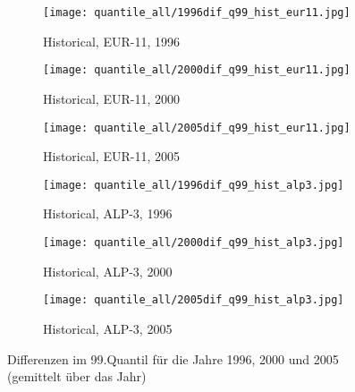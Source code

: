 \begin{figure}
	\begin{subfigure}{0.32\textwidth}
		\texttt{[image: quantile\_all/1996dif\_q99\_hist\_eur11.jpg]}
		\caption{Historical, EUR-11, 1996}
	\end{subfigure}
	\begin{subfigure}{0.32\textwidth}
		\texttt{[image: quantile\_all/2000dif\_q99\_hist\_eur11.jpg]}
		\caption{Historical, EUR-11, 2000}
	\end{subfigure}
	\begin{subfigure}{0.32\textwidth}
		\texttt{[image: quantile\_all/2005dif\_q99\_hist\_eur11.jpg]}
		\caption{Historical, EUR-11, 2005}
	\end{subfigure}
	\begin{subfigure}{0.32\textwidth}
		\texttt{[image: quantile\_all/1996dif\_q99\_hist\_alp3.jpg]}
		\caption{Historical, ALP-3, 1996}
	\end{subfigure}
	\begin{subfigure}{0.32\textwidth}
		\texttt{[image: quantile\_all/2000dif\_q99\_hist\_alp3.jpg]}
		\caption{Historical, ALP-3, 2000}
	\end{subfigure}
	\begin{subfigure}{0.32\textwidth}
		\texttt{[image: quantile\_all/2005dif\_q99\_hist\_alp3.jpg]}
		\caption{Historical, ALP-3, 2005}
	\end{subfigure}
	\caption{Differenzen im 99.Quantil für die Jahre 1996, 2000 und 2005 (gemittelt über das Jahr)}
	\label{fig:quantile_alp3_1}
	\end{figure}
